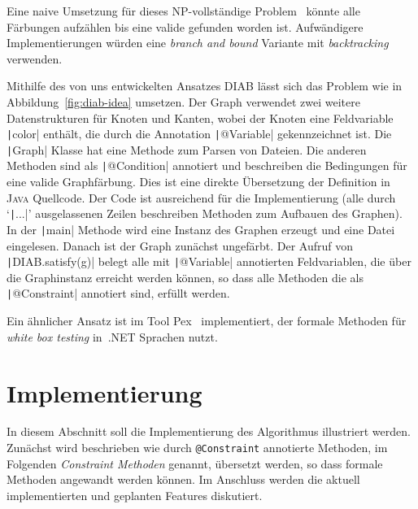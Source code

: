 \documentclass[a4paper,fontsize=12pt,headings=small,captions=tableheading,%
numbers=endperiod,abstracton,pdftex]{scrartcl}
\begin{document}
Eine naive Umsetzung für dieses NP-vollständige Problem~\cite{Kar:72} könnte
alle Färbungen aufzählen bis eine valide gefunden worden ist.  Aufwändigere
Implementierungen würden eine \emph{branch and bound} Variante mit
\emph{backtracking} verwenden.

Mithilfe des von uns entwickelten Ansatzes \textsc{DIAB} lässt sich das Problem
wie in Abbildung~\ref{fig:diab-idea} umsetzen.  Der Graph verwendet zwei weitere
Datenstrukturen für Knoten und Kanten, wobei der Knoten eine Feldvariable
\texttt|color| enthält, die durch die Annotation
\texttt|@Variable| gekennzeichnet ist.  Die \texttt|Graph|
Klasse hat eine Methode zum Parsen von Dateien.  Die anderen Methoden sind als
\texttt|@Condition| annotiert und beschreiben die Bedingungen für eine
valide Graphfärbung.  Dies ist eine direkte Übersetzung der Definition in
\textsc{Java} Quellcode.  Der Code ist ausreichend für die Implementierung (alle
durch `\texttt|...|' ausgelassenen Zeilen beschreiben Methoden zum
Aufbauen des Graphen).  In der \texttt|main| Methode wird eine Instanz
des Graphen erzeugt und eine Datei eingelesen. Danach ist der Graph zunächst
ungefärbt.  Der Aufruf von \texttt|DIAB.satisfy(g)| belegt alle mit
\texttt|@Variable| annotierten Feldvariablen, die über die
Graphinstanz erreicht werden können, so dass alle Methoden die als
\texttt|@Constraint| annotiert sind, erfüllt werden.

Ein ähnlicher Ansatz ist im Tool Pex~\cite{TS:05} implementiert, der formale
Methoden für \emph{white box testing} in~.NET Sprachen nutzt.

\section{Implementierung}
In diesem Abschnitt soll die Implementierung des Algorithmus illustriert werden.
Zunächst wird beschrieben wie durch \texttt{@Constraint} annotierte
Methoden, im Folgenden \emph{Constraint Methoden} genannt, übersetzt werden, so
dass formale Methoden angewandt werden können.  Im Anschluss werden die aktuell
implementierten und geplanten Features diskutiert.
\end{document}
